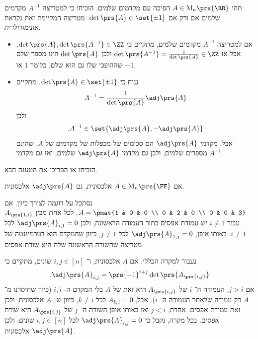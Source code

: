 \documentclass[a4paper,10pt,twoside,openany]{book}
\renewcommand{\Mat}{\mathrm{M}}
\begin{document}
\begin{exercisechap}
תהי
$A \in \Mat_n\prs{\RR}$
הפיכה עם מקדמים שלמים.
הוכיחו כי למטריצה
$A^{-1}$
מקדמים שלמים אם ורק אם
$\det\prs{A} \in \set{\pm 1}$.
מטריצה המקיימת זאת נקראת
\emph{אונימודולרית}.
\end{exercisechap}

\begin{solution}
\begin{itemize}
\item אם למטריצה
$A^{-1}$
מקדמים שלמים, מתקיים כי
$\det\prs{A}, \det\prs{A^{-1}} \in \ZZ$,
אבל אז
$\det\prs{A^{-1}} = \frac{1}{\det\prs{A}} \in \ZZ$
ולכן
$\det\prs{A}$
הינו מספר שלם שההופכי שלו גם הוא שלם, כלומר
$1$
או
$-1$.

\item נניח כי
$\det\prs{A} \in \set{\pm 1}$.
מתקיים
\begin{align*}
A^{-1} = \frac{1}{\det\prs{A}} \adj\prs{A}
\end{align*}
ולכן
\[\text{.} A^{-1} \in \set{\adj\prs{A}, -\adj\prs{A}}\]
אבל, מקדמי
$\adj\prs{A}$
הם סכומים של מכפלות של מקדמים של
$A$,
שהינם מספרים שלמים, ולכן גם מקדמי
$\adj\prs{A}$
שלמים, ואז גם מקדמי
$A^{-1}$.
\end{itemize}
\end{solution}

\begin{exercisechap}
הוכיחו או הפריכו את הטענה הבא.

אם
$A \in \Mat_n\prs{\FF}$
אלכסונית, גם
$\adj\prs{A}$
אלכסונית.
\end{exercisechap}

\begin{solution}
נסתכל על דוגמה לצורך כיוון. אם
$A = \pmat{1 & 0 & 0 \\ 0 & 2 & 0 \\ 0 & 0 & 3}$,
לכל אחת מבין
$A_{\prs{1,i}}$
עבור
$i \neq 1$
יש עמודת אפסים בתור העמודה הראשונה, ולכן
$\adj\prs{A}_{i,1} = 0$
לכל
$i \neq 1$.
באותו אופן,
$\adj\prs{A}_{1,j} = 0$
לכל
$j \neq 1$,
כיוון שהמקדם הוא דטרמיננטה של מטריצה שהשורה הראשונה שלה היא שורת אפסים.

נעבור למקרה הכללי. אם
$A$
אלכסונית, ו־%
$i,j \in [n]$
שונים, מתקיים כי
\[\text{.} \adj\prs{A}_{i,j} = \prs{-1}^{i+j} \det\prs{A_{\prs{i,j}}}\]
אם
$j > i$,
העמודה ה־%
$i$
של
$A_{\prs{i,j}}$
היא זאת של
$A$
בלי המקדם ה-%
$i,i$
(כיוון שחיסרנו מ־$A$ רק עמודה שלאחר העמודה ה־%
$i$).
אבל,
$A_{k,i} = 0$
לכל
$k \neq i$,
כיוון ש־%
$A$
אלכסונית, ולכן זאת עמודת אפסים.
אחרת,
$j < i$
ואז באותו אופן השורה ה־%
$j$
של
$A_{\prs{i,j}}$
היא שורת אפסים. בכל מקרה, נקבל כי
$\adj\prs{A}_{i,j} = 0$
לכל
$i,j \in [n]$
שונים, ולכן
$\adj\prs{A}$
אלכסונית.
\end{solution}
\end{document}
